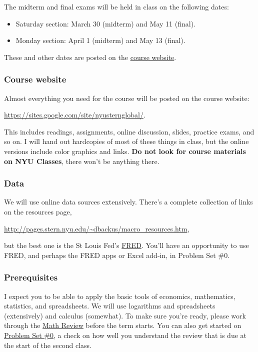 \documentclass[12pt]{article}
\begin{document}
The midterm and final exams will be held in class on the following dates:
%
\begin{itemize}
\item Saturday section:  March 30 (midterm) and May 11 (final).
\item Monday section:  April 1 (midterm) and May 13 (final).
\end{itemize}
These and other dates are posted on the
\href{https://sites.google.com/site/nyusternglobal/home/outline}{course website}.

\subsubsection*{Course website}

Almost everything you need for the course will be posted on the course website:

\vspace*{\parskip}
\centerline{\url{https://sites.google.com/site/nyusternglobal/}.}

This includes readings, assignments, online discussion,
slides, practice exams, and so on.
I will hand out hardcopies of most of these things in class,
but the online versions include color graphics and links.
{\bf Do not look for course materials on NYU Classes},
there won't be anything there.

\subsubsection*{Data}

We will use online data sources extensively.
There's a complete collection of links on the resources page,

\vspace*{\parskip}
\centerline{\url{http://pages.stern.nyu.edu/~dbackus/macro_resources.htm},}

but the best one is the St Louis Fed's
\href{http://research.stlouisfed.org/fred2/}{FRED}.
You'll have an opportunity to use FRED, and perhaps the FRED apps or Excel add-in,
in Problem Set \#0.


\subsubsection*{Prerequisites}

I expect you to be able to apply the basic tools of economics,
mathematics, statistics, and spreadsheets.  We will use
logarithms and spreadsheets (extensively) and calculus (somewhat).
To make sure you're ready,
please work through the
\href{http://www.stern.nyu.edu/~dbackus/2303/notes_math.pdf}{Math Review}
before the term starts.
You can also get started on
\href{http://www.stern.nyu.edu/~dbackus/2303/ps0_s13.pdf}{Problem Set \#0},
a check on how well you understand the review
that is due at the start of the second class.
\end{document}

